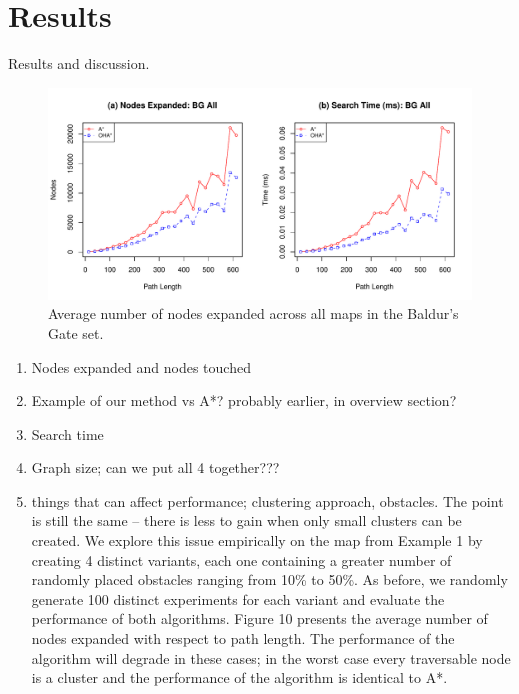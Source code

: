 \section{Results}
Results and discussion.




\begin{figure}[htbp]
	\vspace{-2pt}
	\begin{center}
		       \includegraphics[scale=0.35, trim = 20mm 17mm 20mm 5mm]{diagrams/bg_effort.pdf}
	\end{center}
	\caption{Average number of nodes expanded across all maps in the Baldur's Gate set.}
	\label{aha-fig:pathquality}
\end{figure}
\par \indent


\begin{enumerate}
 \item{Nodes expanded and nodes touched}
 \item{Example of our method vs A*? probably earlier, in overview section?}
 \item{Search time}
 \item{Graph size; can we put all 4 together???}
 \item{things that can affect performance; clustering approach, obstacles. 
	The point is still the same -- there is less to gain when only small
	clusters can be created. 
	We explore this issue empirically on the map from Example 1 by creating 4 distinct
	variants, each one containing a greater number of randomly placed obstacles
	ranging from 10\% to 50\%. 
	As before, we randomly generate 100 distinct experiments for each variant and evaluate
	the performance of both algorithms. 
	Figure 10 presents the average number of nodes expanded with respect to path length. 
	The performance of the algorithm will degrade in these cases; in the worst
	case every traversable node is a cluster and the performance of the algorithm is
	identical to A*. }
\end{enumerate}
